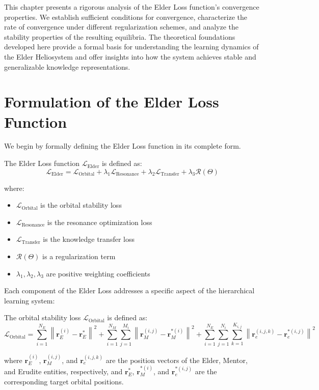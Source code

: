 This chapter presents a rigorous analysis of the Elder Loss function's convergence properties. We establish sufficient conditions for convergence, characterize the rate of convergence under different regularization schemes, and analyze the stability properties of the resulting equilibria. The theoretical foundations developed here provide a formal basis for understanding the learning dynamics of the Elder Heliosystem and offer insights into how the system achieves stable and generalizable knowledge representations.

\section{Formulation of the Elder Loss Function}

We begin by formally defining the Elder Loss function in its complete form.

\begin{definition}
The Elder Loss function $\mathcal{L}_{\text{Elder}}$ is defined as:
\begin{equation}
\mathcal{L}_{\text{Elder}} = \mathcal{L}_{\text{Orbital}} + \lambda_1 \mathcal{L}_{\text{Resonance}} + \lambda_2 \mathcal{L}_{\text{Transfer}} + \lambda_3 \mathcal{R}(\Theta)
\end{equation}

where:
\begin{itemize}
    \item $\mathcal{L}_{\text{Orbital}}$ is the orbital stability loss
    \item $\mathcal{L}_{\text{Resonance}}$ is the resonance optimization loss
    \item $\mathcal{L}_{\text{Transfer}}$ is the knowledge transfer loss
    \item $\mathcal{R}(\Theta)$ is a regularization term
    \item $\lambda_1, \lambda_2, \lambda_3$ are positive weighting coefficients
\end{itemize}
\end{definition}

Each component of the Elder Loss addresses a specific aspect of the hierarchical learning system:

\begin{definition}
The orbital stability loss $\mathcal{L}_{\text{Orbital}}$ is defined as:
\begin{equation}
\mathcal{L}_{\text{Orbital}} = \sum_{i=1}^{N_E} \left\|\mathbf{r}_E^{(i)} - \mathbf{r}_E^{*}\right\|^2 + \sum_{i=1}^{N_M} \sum_{j=1}^{M_i} \left\|\mathbf{r}_M^{(i,j)} - \mathbf{r}_M^{*(i)}\right\|^2 + \sum_{i=1}^{N_E} \sum_{j=1}^{N_i} \sum_{k=1}^{K_{i,j}} \left\|\mathbf{r}_e^{(i,j,k)} - \mathbf{r}_e^{*(i,j)}\right\|^2
\end{equation}

where $\mathbf{r}_E^{(i)}$, $\mathbf{r}_M^{(i,j)}$, and $\mathbf{r}_e^{(i,j,k)}$ are the position vectors of the Elder, Mentor, and Erudite entities, respectively, and $\mathbf{r}_E^{*}$, $\mathbf{r}_M^{*(i)}$, and $\mathbf{r}_e^{*(i,j)}$ are the corresponding target orbital positions.
\end{definition}


